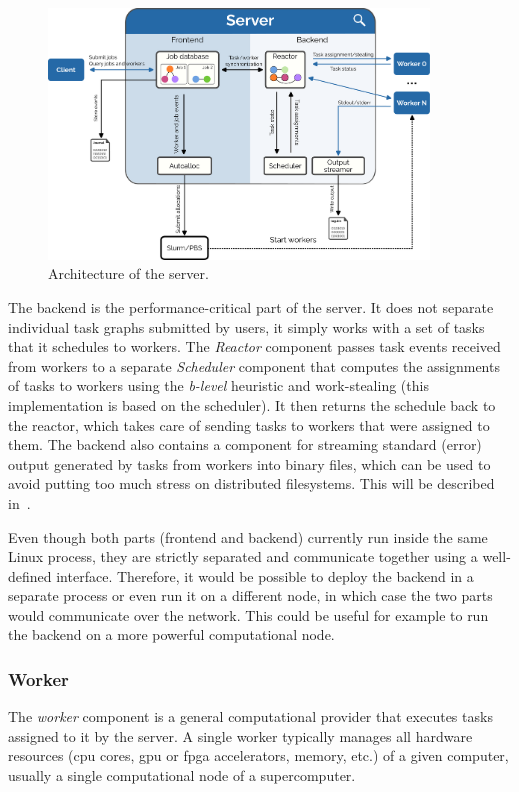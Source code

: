 \begin{figure}[h]
	\centering
	\includegraphics[width=0.9\textwidth]{imgs/hq/server-architecture}
	\caption{Architecture of the \hyperqueue{} server.}
	\label{fig:hq-server-architecture}
\end{figure}

The backend is the performance-critical part of the server. It does not separate individual task
graphs submitted by users, it simply works with a set of tasks that it schedules to workers. The
\emph{Reactor} component passes task events received from workers to a separate
\emph{Scheduler} component that computes the assignments of tasks to workers using the
\emph{b-level} heuristic and work-stealing (this implementation is based on the
\rsds{} scheduler). It then returns the schedule back to the reactor, which takes
care of sending tasks to workers that were assigned to them. The backend also contains a component
for streaming standard (error) output generated by tasks from workers into binary files, which can
be used to avoid putting too much stress on distributed filesystems. This will be described
in~.

Even though both parts (frontend and backend) currently run inside the same Linux process, they are
strictly separated and communicate together using a well-defined interface. Therefore, it would be
possible to deploy the backend in a separate process or even run it on a different node, in which
case the two parts would communicate over the network. This could be useful for example to run the
backend on a more powerful computational node.

\subsubsection*{Worker}
The \emph{worker} component is a general computational provider that executes tasks
assigned to it by the server. A single worker typically manages all hardware resources
(\gls{cpu} cores, \gls{gpu} or \gls{fpga} accelerators,
memory, etc.) of a given computer, usually a single computational node of a supercomputer.

